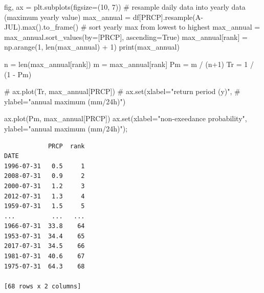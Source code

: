 \documentclass[
  letterpaper,
  DIV=11,
  numbers=noendperiod]{scrreprt}
\newenvironment{Shaded}{\begin{snugshade}}{\end{snugshade}}
\newcommand{\BuiltInTok}[1]{\textcolor[rgb]{0.00,0.23,0.31}{#1}}
\newcommand{\CommentTok}[1]{\textcolor[rgb]{0.37,0.37,0.37}{#1}}
\newcommand{\DecValTok}[1]{\textcolor[rgb]{0.68,0.00,0.00}{#1}}
\newcommand{\NormalTok}[1]{\textcolor[rgb]{0.00,0.23,0.31}{#1}}
\newcommand{\OperatorTok}[1]{\textcolor[rgb]{0.37,0.37,0.37}{#1}}
\newcommand{\StringTok}[1]{\textcolor[rgb]{0.13,0.47,0.30}{#1}}
\newcommand{\VariableTok}[1]{\textcolor[rgb]{0.07,0.07,0.07}{#1}}
\begin{document}
\begin{Shaded}
\begin{Highlighting}[]
\NormalTok{fig, ax }\OperatorTok{=}\NormalTok{ plt.subplots(figsize}\OperatorTok{=}\NormalTok{(}\DecValTok{10}\NormalTok{, }\DecValTok{7}\NormalTok{))}
\CommentTok{\# resample daily data into yearly data (maximum yearly value)}
\NormalTok{max\_annual }\OperatorTok{=}\NormalTok{ df[}\StringTok{\textquotesingle{}PRCP\textquotesingle{}}\NormalTok{].resample(}\StringTok{\textquotesingle{}A{-}JUL\textquotesingle{}}\NormalTok{).}\BuiltInTok{max}\NormalTok{().to\_frame()}
\CommentTok{\# sort yearly max from lowest to highest}
\NormalTok{max\_annual }\OperatorTok{=}\NormalTok{ max\_annual.sort\_values(by}\OperatorTok{=}\NormalTok{[}\StringTok{\textquotesingle{}PRCP\textquotesingle{}}\NormalTok{], ascending}\OperatorTok{=}\VariableTok{True}\NormalTok{)}
\NormalTok{max\_annual[}\StringTok{\textquotesingle{}rank\textquotesingle{}}\NormalTok{] }\OperatorTok{=}\NormalTok{ np.arange(}\DecValTok{1}\NormalTok{, }\BuiltInTok{len}\NormalTok{(max\_annual) }\OperatorTok{+} \DecValTok{1}\NormalTok{)}
\BuiltInTok{print}\NormalTok{(max\_annual)}

\NormalTok{n }\OperatorTok{=} \BuiltInTok{len}\NormalTok{(max\_annual[}\StringTok{\textquotesingle{}rank\textquotesingle{}}\NormalTok{])}
\NormalTok{m }\OperatorTok{=}\NormalTok{ max\_annual[}\StringTok{\textquotesingle{}rank\textquotesingle{}}\NormalTok{]}
\NormalTok{Pm }\OperatorTok{=}\NormalTok{ m }\OperatorTok{/}\NormalTok{ (n}\OperatorTok{+}\DecValTok{1}\NormalTok{)}
\NormalTok{Tr }\OperatorTok{=} \DecValTok{1} \OperatorTok{/}\NormalTok{ (}\DecValTok{1} \OperatorTok{{-}}\NormalTok{ Pm)}

\CommentTok{\# ax.plot(Tr, max\_annual[\textquotesingle{}PRCP\textquotesingle{}])}
\CommentTok{\# ax.set(xlabel="return period (y)",}
\CommentTok{\#        ylabel="annual maximum (mm/24h)")}

\NormalTok{ax.plot(Pm, max\_annual[}\StringTok{\textquotesingle{}PRCP\textquotesingle{}}\NormalTok{])}
\NormalTok{ax.}\BuiltInTok{set}\NormalTok{(xlabel}\OperatorTok{=}\StringTok{"non{-}exeedance probability"}\NormalTok{,}
\NormalTok{       ylabel}\OperatorTok{=}\StringTok{"annual maximum (mm/24h)"}\NormalTok{)}\OperatorTok{;}
\end{Highlighting}
\end{Shaded}

\begin{verbatim}
            PRCP  rank
DATE                  
1996-07-31   0.5     1
2008-07-31   0.9     2
2000-07-31   1.2     3
2012-07-31   1.3     4
1959-07-31   1.5     5
...          ...   ...
1966-07-31  33.8    64
1953-07-31  34.4    65
2017-07-31  34.5    66
1981-07-31  40.6    67
1975-07-31  64.3    68

[68 rows x 2 columns]
\end{verbatim}
\end{document}

